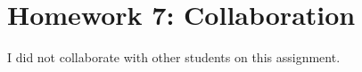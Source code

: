 \documentclass[11pt]{article}
\begin{document}
\section*{Homework 7: Collaboration}

I did not collaborate with other students on this assignment.
\end{document}
